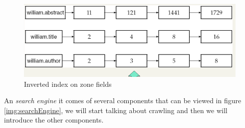 \begin{figure}
    \caption{Inverted index on zone fields}
    \label{img:zoneIndex}
    \includegraphics[width=\textwidth]{Images/zoneIndex}
\end{figure}

An \emph{search engine} it comes of several components that can be viewed in figure \ref{img:searchEngine}, 
we will start talking about crawling and then we will introduce the other components.

